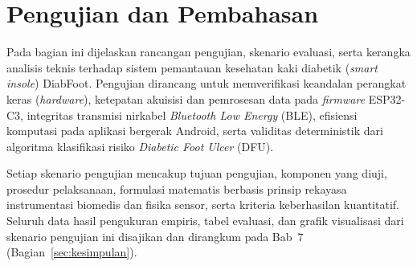 \section{Pengujian dan Pembahasan}
\label{sec:pengujian}

Pada bagian ini dijelaskan rancangan pengujian, skenario evaluasi, serta kerangka analisis teknis terhadap sistem pemantauan kesehatan kaki diabetik (\textit{smart insole}) DiabFoot. Pengujian dirancang untuk memverifikasi keandalan perangkat keras (\textit{hardware}), ketepatan akuisisi dan pemrosesan data pada \textit{firmware} ESP32-C3, integritas transmisi nirkabel \textit{Bluetooth Low Energy} (BLE), efisiensi komputasi pada aplikasi bergerak Android, serta validitas deterministik dari algoritma klasifikasi risiko \textit{Diabetic Foot Ulcer} (DFU).

Setiap skenario pengujian mencakup tujuan pengujian, komponen yang diuji, prosedur pelaksanaan, formulasi matematis berbasis prinsip rekayasa instrumentasi biomedis dan fisika sensor, serta kriteria keberhasilan kuantitatif. Seluruh data hasil pengukuran empiris, tabel evaluasi, dan grafik visualisasi dari skenario pengujian ini disajikan dan dirangkum pada Bab~7 (Bagian~\ref{sec:kesimpulan}).

